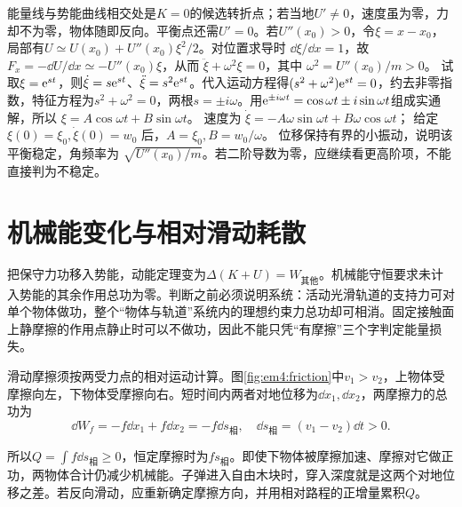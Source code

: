 能量线与势能曲线相交处是$K=0$的候选转折点；若当地$U'\ne0$，速度虽为零，力却不为零，物体随即反向。平衡点还需$U'=0$。若$U''(x_0)>0$，令$\xi=x-x_0$，局部有$U\simeq U(x_0)+U''(x_0)\xi^2/2$。对位置求导时 $\dd\xi/\dd x=1$，故
$F_x=-\dd U/\dd x\simeq-U''(x_0)\xi$，从而
$\ddot\xi+\omega^2\xi=0$，其中 $\omega^2=U''(x_0)/m>0$。
试取$\xi=\mathrm e^{st}$，则$\dot\xi=s\mathrm e^{st}$、$\ddot\xi=s^2\mathrm e^{st}$。代入运动方程得$(s^2+\omega^2)\mathrm e^{st}=0$，约去非零指数，特征方程为$s^2+\omega^2=0$，两根$s=\pm i\omega$。用$\mathrm e^{\pm i\omega t}=\cos\omega t\pm i\sin\omega t$组成实通解，所以
$\xi=A\cos\omega t+B\sin\omega t$。
速度为 $\dot\xi=-A\omega\sin\omega t+B\omega\cos\omega t$；
给定 $\xi(0)=\xi_0,\dot\xi(0)=w_0$ 后，$A=\xi_0,B=w_0/\omega$。
位移保持有界的小振动，说明该平衡稳定，角频率为 $\sqrt{U''(x_0)/m}$。若二阶导数为零，应继续看更高阶项，不能直接判为不稳定。

\section{机械能变化与相对滑动耗散}

把保守力功移入势能，动能定理变为$\Delta(K+U)=W_{\text{其他}}$。机械能守恒要求未计入势能的其余作用总功为零。判断之前必须说明系统：活动光滑轨道的支持力可对单个物体做功，整个“物体与轨道”系统内的理想约束力总功却可相消。固定接触面上静摩擦的作用点静止时可以不做功，因此不能只凭“有摩擦”三个字判定能量损失。

滑动摩擦须按两受力点的相对运动计算。图\ref{fig:em4:friction}中$v_1>v_2$，上物体受摩擦向左，下物体受摩擦向右。短时间内两者对地位移为$\dd x_1,\dd x_2$，两摩擦力的总功为
\[
 \dd W_f=-f\dd x_1+f\dd x_2=-f\dd s_{\text{相}},\quad
 \dd s_{\text{相}}=(v_1-v_2)\dd t>0.
\]


所以$Q=\int f\dd s_{\text{相}}\ge0$，恒定摩擦时为$fs_{\text{相}}$。即使下物体被摩擦加速、摩擦对它做正功，两物体合计仍减少机械能。子弹进入自由木块时，穿入深度就是这两个对地位移之差。若反向滑动，应重新确定摩擦方向，并用相对路程的正增量累积$Q$。

